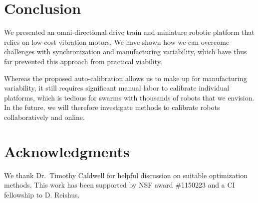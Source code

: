 \documentclass[letterpaper, 10pt, conference]{ieeeconf}
\begin{document}
\section{Conclusion}
We presented an omni-directional drive train and miniature robotic platform that relies on low-cost vibration motors. We have shown how we can overcome challenges with synchronization and manufacturing variability, which have thus far prevented this approach from practical viability. 

Whereas the proposed auto-calibration allows us to make up for manufacturing variability, it still requires significant manual labor to calibrate individual platforms, which is tedious for swarms with thousands of robots that we envision. In the future, we will therefore investigate methods to calibrate robots collaboratively and online.  


\section*{Acknowledgments} We thank Dr.\ Timothy Caldwell for helpful discussion on suitable optimization methods. 
This work has been supported by NSF award \#1150223 and a CI fellowship to D. Reishus.




\end{document}
